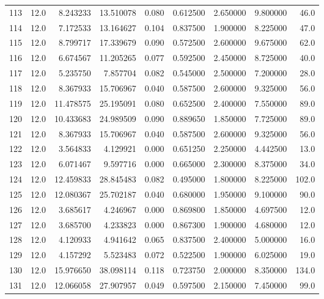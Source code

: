 \begin{tabular}{lrrrrrrrr}
113  &   12.0 &   8.243233 &  13.510078 &  0.080 &  0.612500 &  2.650000 &   9.800000 &   46.0 \\
114  &   12.0 &   7.172533 &  13.164627 &  0.104 &  0.837500 &  1.900000 &   8.225000 &   47.0 \\
115  &   12.0 &   8.799717 &  17.339679 &  0.090 &  0.572500 &  2.600000 &   9.675000 &   62.0 \\
116  &   12.0 &   6.674567 &  11.205265 &  0.077 &  0.592500 &  2.450000 &   8.725000 &   40.0 \\
117  &   12.0 &   5.235750 &   7.857704 &  0.082 &  0.545000 &  2.500000 &   7.200000 &   28.0 \\
118  &   12.0 &   8.367933 &  15.706967 &  0.040 &  0.587500 &  2.600000 &   9.325000 &   56.0 \\
119  &   12.0 &  11.478575 &  25.195091 &  0.080 &  0.652500 &  2.400000 &   7.550000 &   89.0 \\
120  &   12.0 &  10.433683 &  24.989509 &  0.090 &  0.889650 &  1.850000 &   7.725000 &   89.0 \\
121  &   12.0 &   8.367933 &  15.706967 &  0.040 &  0.587500 &  2.600000 &   9.325000 &   56.0 \\
122  &   12.0 &   3.564833 &   4.129921 &  0.000 &  0.651250 &  2.250000 &   4.442500 &   13.0 \\
123  &   12.0 &   6.071467 &   9.597716 &  0.000 &  0.665000 &  2.300000 &   8.375000 &   34.0 \\
124  &   12.0 &  12.459833 &  28.845483 &  0.082 &  0.495000 &  1.800000 &   8.225000 &  102.0 \\
125  &   12.0 &  12.080367 &  25.702187 &  0.040 &  0.680000 &  1.950000 &   9.100000 &   90.0 \\
126  &   12.0 &   3.685617 &   4.246967 &  0.000 &  0.869800 &  1.850000 &   4.697500 &   12.0 \\
127  &   12.0 &   3.685700 &   4.233823 &  0.000 &  0.867300 &  1.900000 &   4.680000 &   12.0 \\
128  &   12.0 &   4.120933 &   4.941642 &  0.065 &  0.837500 &  2.400000 &   5.000000 &   16.0 \\
129  &   12.0 &   4.157292 &   5.523483 &  0.072 &  0.522500 &  1.900000 &   6.025000 &   19.0 \\
130  &   12.0 &  15.976650 &  38.098114 &  0.118 &  0.723750 &  2.000000 &   8.350000 &  134.0 \\
131  &   12.0 &  12.066058 &  27.907957 &  0.049 &  0.597500 &  2.150000 &   7.450000 &   99.0 \\

\end{tabular}

